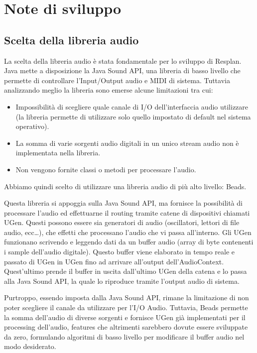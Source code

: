 \documentclass[a4paper,12pt]{report}
\begin{document}
\section{Note di sviluppo}
\subsection{Scelta della libreria audio}
La scelta della libreria audio è stata fondamentale per lo sviluppo di Resplan.
Java mette a disposizione la Java Sound API, una libreria di basso livello che permette di controllare l’Input/Output audio e MIDI di sistema. 
Tuttavia analizzando meglio la libreria sono emerse alcune limitazioni tra cui:
\begin{itemize}
    \item Impossibilità di scegliere quale canale di I/O dell’interfaccia audio utilizzare (la libreria permette di utilizzare solo quello impostato di default nel sistema operativo).
    \item La somma di varie sorgenti audio digitali in un unico stream audio non è implementata nella libreria.
    \item Non vengono fornite classi o metodi per processare l’audio.
\end{itemize}
Abbiamo quindi scelto di utilizzare una libreria audio di più alto livello: Beads.

Questa libreria si appoggia sulla Java Sound API, ma fornisce la possibilità di processare l’audio ed effettuarne il routing tramite catene di dispositivi chiamati UGen.
Questi possono essere sia generatori di audio (oscillatori, lettori di file audio, ecc…), che effetti che processano l’audio che vi passa all’interno.
Gli UGen funzionano scrivendo e leggendo dati da un buffer audio (array di byte contenenti i sample dell’audio digitale). Questo buffer viene elaborato in tempo reale e passato di UGen in UGen fino ad arrivare all’output dell’AudioContext. Quest’ultimo prende il buffer in uscita dall’ultimo UGen della catena e lo passa alla Java Sound API, la quale lo riproduce tramite l’output audio di sistema.

Purtroppo, essendo imposta dalla Java Sound API, rimane la limitazione di non poter scegliere il canale da utilizzare per l’I/O Audio. Tuttavia, Beads permette la somma dell’audio di diverse sorgenti e fornisce UGen già implementati per il processing dell’audio, features che altrimenti sarebbero dovute essere sviluppate da zero, formulando algoritmi di basso livello per modificare il buffer audio nel modo desiderato.
\end{document}
